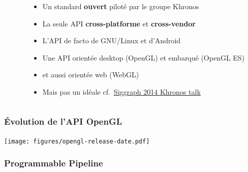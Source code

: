 \begin{frame}
\begin{columns}
\begin{column}{.2\textwidth}
\begin{center}
      \end{center}
    \end{column}
    \begin{column}{.8\textwidth}
      \begin{itemize}
      \item Un standard \textbf{ouvert} piloté par le groupe Khronos
      \item La seule API \textbf{cross-platforme} et \textbf{cross-vendor} %
      \item L'API de facto de GNU/Linux et d'Android
      \item Une API orientée desktop (OpenGL) et embarqué (OpenGL ES)
      \item et aussi orientée web (WebGL)
      \item \alert{Mais pas un idéale} cf.\ \href{https://www.khronos.org/assets/uploads/developers/library/2014-siggraph-bof/OpenGL-Ecosystem-BOF_Aug14.pdf}{Siggraph 2014 Khronos talk}
      \end{itemize}
    \end{column}
  \end{columns}
\end{frame}

\begin{frame}
  \frametitle{Évolution de l'API OpenGL}
  \begin{center}
    \texttt{[image: figures/opengl-release-date.pdf]} %
  \end{center}
\end{frame}

\begin{frame}
  \frametitle{Programmable Pipeline}
\end{frame}

